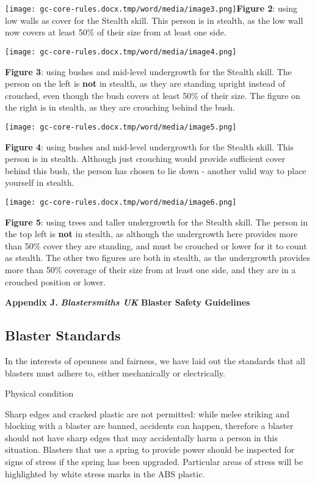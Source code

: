\documentclass{scrbook}
\begin{document}
\texttt{[image: gc-core-rules.docx.tmp/word/media/image3.png]}\textbf{Figure 2}: using low walls as cover for the Stealth skill. This person is in stealth, as the low wall now covers at least 50\% of their size from at least one side.

\texttt{[image: gc-core-rules.docx.tmp/word/media/image4.png]}

\textbf{Figure 3}: using bushes and mid-level undergrowth for the Stealth skill. The person on the left is \textbf{not} in stealth, as they are standing upright instead of crouched, even though the bush covers at least 50\% of their size. The figure on the right is in stealth, as they are crouching behind the bush.

\texttt{[image: gc-core-rules.docx.tmp/word/media/image5.png]}

\textbf{Figure 4}: using bushes and mid-level undergrowth for the Stealth skill. This person is in stealth. Although just crouching would provide sufficient cover behind this bush, the person has chosen to lie down - another valid way to place yourself in stealth.

\texttt{[image: gc-core-rules.docx.tmp/word/media/image6.png]}

\textbf{Figure 5}: using trees and taller undergrowth for the Stealth skill. The person in the top left is \textbf{not} in stealth, as although the undergrowth here provides more than 50\% cover they are standing, and must be crouched or lower for it to count as stealth. The other two figures are both in stealth, as the undergrowth provides more than 50\% coverage of their size from at least one side, and they are in a crouched position or lower.

\textbf{Appendix J.} \textbf{\textit{Blastersmiths UK}} \textbf{Blaster Safety Guidelines}

\subsection{Blaster Standards}

In the interests of openness and fairness, we have laid out the standards that all blasters must adhere to, either mechanically or electrically.

Physical condition

Sharp edges and cracked plastic are not permitted: while melee striking and blocking with a blaster are banned, accidents can happen, therefore a blaster should not have sharp edges that may accidentally harm a person in this situation. Blasters that use a spring to provide power should be inspected for signs of stress if the spring has been upgraded. Particular areas of stress will be highlighted by white stress marks in the ABS plastic.
\end{document}
